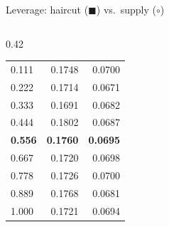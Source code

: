 \documentclass[aspectratio=169,10pt]{beamer}
\begin{document}
\begin{frame}{Leverage: haircut ($\blacksquare$) vs.\ supply ($\circ$)}
\begin{columns}[T]
\begin{column}{0.42\textwidth}
\begin{tabular}{lrr}
        0.111 & 0.1748 & 0.0700 \\
        0.222 & 0.1714 & 0.0671 \\
        0.333 & 0.1691 & 0.0682 \\
        0.444 & 0.1802 & 0.0687 \\
        \textbf{0.556} & \textbf{0.1760} & \textbf{0.0695} \\
        0.667 & 0.1720 & 0.0698 \\
        0.778 & 0.1726 & 0.0700 \\
        0.889 & 0.1768 & 0.0681 \\
        1.000 & 0.1721 & 0.0694 \\
        \bottomrule
      \end{tabular}
    \end{column}
  \end{columns}
\end{frame}
\end{document}
